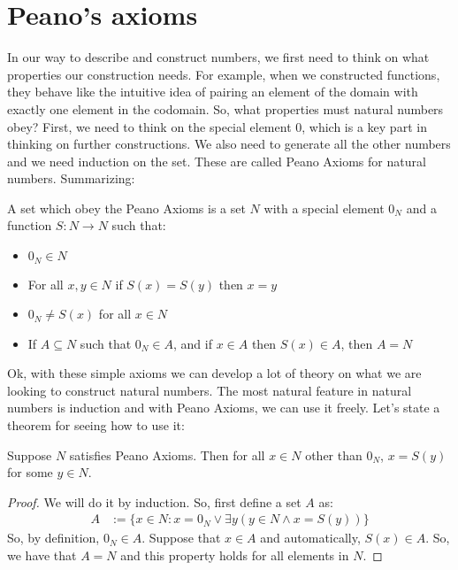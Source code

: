 \documentclass{tufte-handout}
\begin{document}
\section{Peano's axioms}
In our way to describe and construct numbers, we first need to think on what properties our construction needs. For example, when we constructed functions, they behave like the intuitive idea of pairing an element of the domain with exactly one element in the codomain. So, what properties must natural numbers obey? First, we need to think on the special element $0$, which is a key part in thinking on further constructions. We also need to generate all the other numbers and we need induction on the set. These are called Peano Axioms for natural numbers. Summarizing:

\begin{axiom}
	A set which obey the Peano Axioms is a set $N$ with a special element $0_N$ and a function $S: N \to N$ such that:
	\begin{itemize}
		\item $0_N \in N$
		\item For all $x, y \in N$ if $S(x) = S(y)$ then $x = y$
		\item $0_N \neq S(x)$ for all $x \in N$
		\item If $A \subseteq N$ such that $0_N \in A$, and if $x \in A$ then $S(x) \in A$, then $A = N$
	\end{itemize}
\end{axiom}

Ok, with these simple axioms we can develop a lot of theory on what we are looking to construct natural numbers. The most natural feature in natural numbers is induction and with Peano Axioms, we can use it freely. Let's state a theorem for seeing how to use it:
\begin{theorem}
	Suppose $N$ satisfies Peano Axioms. Then for all $x \in N$ other than $0_N$, $x = S(y)$ for some $y \in N$.
\end{theorem}
\begin{proof}
	We will do it by induction. So, first define a set $A$ as:
	\begin{align*}
		A &:= \{x \in N: x = 0_N \vee \exists y (y \in N \wedge x = S(y))\}
	\end{align*}
	So, by definition, $0_N \in A$. Suppose that $x \in A$ and automatically, $S(x) \in A$. So, we have that $A = N$ and this property holds for all elements in $N$.
\end{proof}
\end{document}
